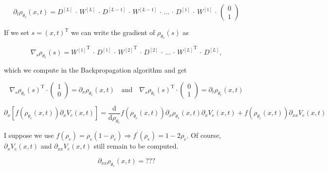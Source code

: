 \begin{equation*}
    \partial_t \rho_{\theta_e}(x, t) = D^{[L]} \, \cdot \, W^{[L]} \, \cdot \, D^{[L-1]} \, \cdot \, W^{[L-1]} \, \cdot \, \ldots \, \cdot \, D^{[1]} \, \cdot \, W^{[1]} \, \cdot \, \begin{pmatrix} 0 \\ 1 \end{pmatrix} 
\end{equation*}

If we set $s = (x, t)^{\mathrm{T}}$ we can write the gradient of $\rho_{\theta_e}(s)$ as

\begin{equation*}
    \nabla_s \rho_{\theta_e}(s) = {W^{[1]}}^{\mathrm{T}} \, \cdot \, D^{[1]} \, \cdot \, {W^{[2]}}^{\mathrm{T}} \, \cdot \, D^{[2]} \, \cdot \, \ldots \, \cdot \, {W^{[L]}}^{\mathrm{T}} \, \cdot \, D^{[L]},
\end{equation*}

which we compute in the Backpropagation algorithm and get

\begin{equation*}
    {\nabla_s \rho_{\theta_e}(s)}^{\mathrm{T}} \cdot \begin{pmatrix} 1 \\ 0 \end{pmatrix} = \partial_x \rho_{\theta_e}(x, t) \quad \text{and} \quad {\nabla_s \rho_{\theta_e}(s)}^{\mathrm{T}} \cdot \begin{pmatrix} 0 \\ 1 \end{pmatrix} = \partial_t \rho_{\theta_e}(x, t)
\end{equation*}


\begin{equation*}
    \partial_x [f(\rho_{\theta_e}(x, t)) \partial_x V_e(x, t)] = \frac{\mathrm{d}}{\mathrm{d} \rho_{\theta_e}} f(\rho_{\theta_e}(x, t)) \partial_x \rho_{\theta_e}(x, t) \partial_x V_e(x, t) + f(\rho_{\theta_e}(x, t)) \partial_{xx} V_e(x, t)
\end{equation*}

I suppose we use $f(\rho_e) = \rho_e(1-\rho_e) \Rightarrow f^{\prime}(\rho_e) = 1 - 2 \rho_e$. Of course, $\partial_x V_e(x, t)$ and $\partial_{xx} V_e(x, t)$ still remain to be computed. 



\begin{equation*}
    \partial_{x x} \rho_{\theta_e}(x, t) = ???
\end{equation*}

